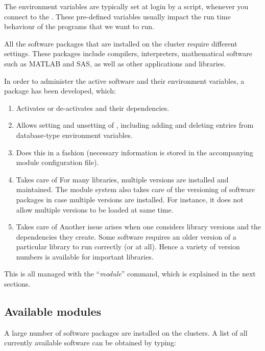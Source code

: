 The environment variables are typically set at login by a script, whenever you
connect to the \hpc. These pre-defined variables usually impact the run time
behaviour of the programs that we want to run.

All the software packages that are installed on the \hpc cluster require
different settings. These packages include compilers, interpreters,
mathematical software such as MATLAB and SAS, as well as other applications and
libraries.

In order to administer the active software and their environment variables, a
 package has been developed, which:

\begin{enumerate}
\item  Activates or de-activates  and their dependencies.
\item  Allows setting and unsetting of , including adding and deleting entries from database-type environment variables.
\item  Does this in a  fashion (necessary information is stored in the accompanying module configuration file).
\item  Takes care of  For many libraries, multiple versions are installed and maintained. The module system also takes care of the versioning of software packages in case multiple versions are installed. For instance, it does not allow multiple versions to be loaded at same time.
\item  Takes care of  Another issue arises when one considers library versions and the dependencies they create. Some software requires an older version of a particular library to run correctly (or at all). Hence a variety of version numbers is available for important libraries.
\end{enumerate}

This is all managed with the ``\emph{module}'' command, which is explained in the next sections.

\subsection{Available modules}

A large number of software packages are installed on the \hpc clusters. A
list of all currently available software can be obtained by typing:

